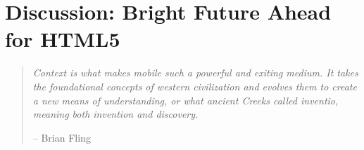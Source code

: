 \chapter{Discussion: Bright Future Ahead for HTML5}
\label{chapter:discussion}

\begin{quotation}
  \noindent \textit{Context  is what makes mobile such  a powerful and
    exiting  medium. It  takes  the foundational  concepts of  western
    civilization  and   evolves  them  to   create  a  new   means  of
    understanding,  or what  ancient Creeks  called  inventio, meaning
    both invention and discovery.}
  \begin{flushright}
    -- Brian Fling \cite{fling2009mobile}
  \end{flushright}
\end{quotation}
